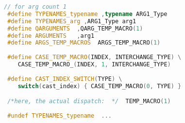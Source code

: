 \begin{lstlisting}[caption={Sample Code Graph Evaluator}, 
  language = C++, numbers = none, label={lst:rzsem},
    basicstyle = \ttfamily\bfseries\footnotesize, linewidth = \linewidth]
 // for arg count 1
 #define TYPENAMES_typename ,typename ARG1_Type
 #define TYPENAMES_arg ,ARG1_Type arg1
 #define QARGUMENTS  ,QARG_TEMP_MACRO(1) 
 #define ARGUMENTS   ,arg1
 #define ARGS_TEMP_MACROS  ARGS_TEMP_MACRO(1) 
 
 #define CASE_TEMP_MACRO(INDEX, INTERCHANGE_TYPE) \
    CASE_TEMP_MACRO_(INDEX, 1, INTERCHANGE_TYPE)
	
 #define CAST_INDEX_SWITCH(TYPE) \
    switch(cast_index) { CASE_TEMP_MACRO(0, TYPE) } 

 /*here, the actual dispatch:  */  TEMP_MACRO(1)
 
 #undef TYPENAMES_typename  ...
\end{lstlisting}

